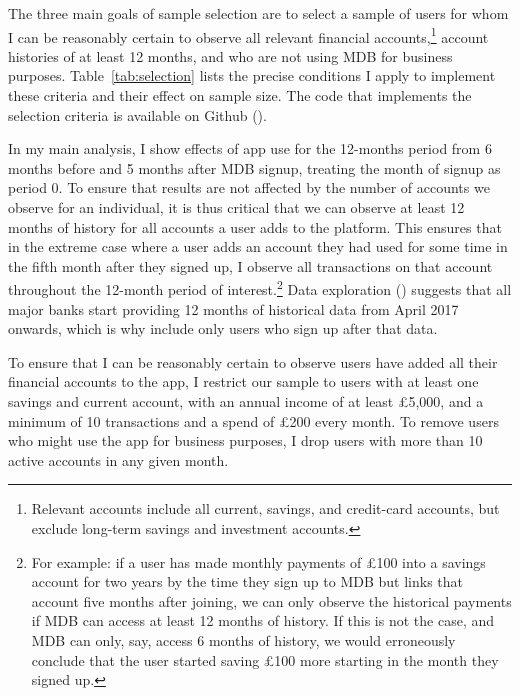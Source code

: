 The three main goals of sample selection are to select a sample of users for whom I
can be reasonably certain to observe all relevant financial
accounts,\footnote{Relevant accounts include all current, savings, and
credit-card accounts, but exclude long-term savings and investment accounts.}
account histories of at least 12 months, and who are not using MDB for business
purposes. Table~\ref{tab:selection} lists the precise conditions I apply to implement
these criteria and their effect on sample size. The code that implements the
selection criteria is available on Github
(\href{https://github.com/fabiangunzinger/mdb_eval/blob/main/src/data/selectors.py}{\faGithub}).

In my main analysis, I show effects of app use for the 12-months period from 6
months before and 5 months after MDB signup, treating the month of signup as
period 0. To ensure that results are not affected by the number of accounts we
observe for an individual, it is thus critical that we can observe at least 12
months of history for all accounts a user adds to the platform. This ensures
that in the extreme case where a user adds an account they had used for some
time in the fifth month after they signed up, I observe all transactions on
that account throughout the 12-month period of interest.\footnote{For example:
    if a user has made monthly payments of \pounds100 into a savings account
    for two years by the time they sign up to MDB but links that account five
    months after joining, we can only observe the historical payments if MDB
    can access at least 12 months of history. If this is not the case, and MDB
    can only, say, access 6 months of history, we would erroneously conclude
that the user started saving \pounds100 more starting in the month they signed
up.} Data exploration
(\href{https://github.com/fabiangunzinger/mdb_eval/blob/d04fe186bb5cca884af2b7c1c7ad429674ef701d/notebooks/available_account_history.ipynb}{\faGithub})
suggests that all major banks start providing 12 months of historical data from
April 2017 onwards, which is why include only users who sign up after that
data.

To ensure that I can be reasonably certain to observe users have added all
their financial accounts to the app, I restrict our sample to users with at
least one savings and current account, with an annual income of at least
\pounds5,000, and a minimum of 10 transactions and a spend of \pounds200 every
month. To remove users who might use the app for business purposes, I drop
users with more than 10 active accounts in any given month.

